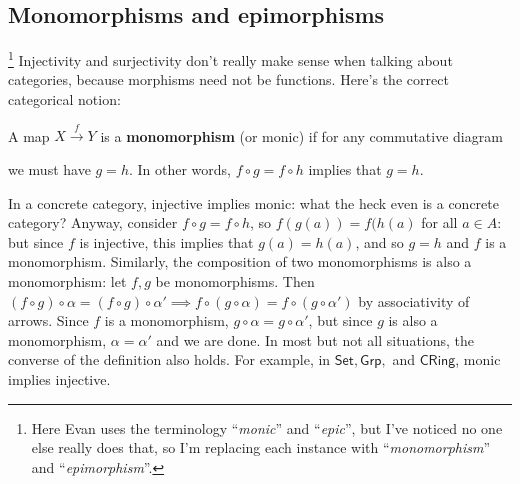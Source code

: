 \subsection{Monomorphisms and epimorphisms}

\footnote{Here Evan uses the terminology ``\emph{monic}'' and ``\emph{epic}'', but I've noticed no one else really does that, so I'm replacing each instance with ``\emph{monomorphism}'' and ``\emph{epimorphism}''.}
Injectivity and surjectivity don't really make sense when talking about categories, because morphisms need not be functions. Here's the correct categorical notion:
\begin{definition}[Monomorphisms]
    A map $X \overset{f}{\to } Y$ is a \textbf{monomorphism} (or monic) if for any commutative diagram
\begin{figure}[H]
\centering
{}
\end{figure}
we must have $g=h$. In other words, $f\circ g=f\circ h$ implies that $g=h$. \end{definition}
In a concrete category, injective implies monic: what the heck even is a concrete category? Anyway, consider $f\circ g=f\circ h$, so $f(g(a))=f(h(a)$ for all $a\in A$: but since $f$ is injective, this implies that $g(a)=h(a)$, and so $g=h$ and $f$ is a monomorphism. 
Similarly, the composition of two monomorphisms is also a monomorphism: let $f,g$ be monomorphisms. Then $(f\circ g)\circ \alpha = (f\circ g)\circ \alpha' \implies f \circ (g\circ \alpha )=f\circ (g\circ \alpha ') $ by associativity of arrows. Since $f$ is a monomorphism, $g\circ \alpha =g\circ \alpha '$, but since $g$ is also a monomorphism, $\alpha =\alpha '$ and we are done.
In most but not all situations, the converse of the definition also holds. For example, in $\mathsf{Set}, \mathsf{Grp} ,$ and $ \mathsf{CRing}  $, monic implies injective.

